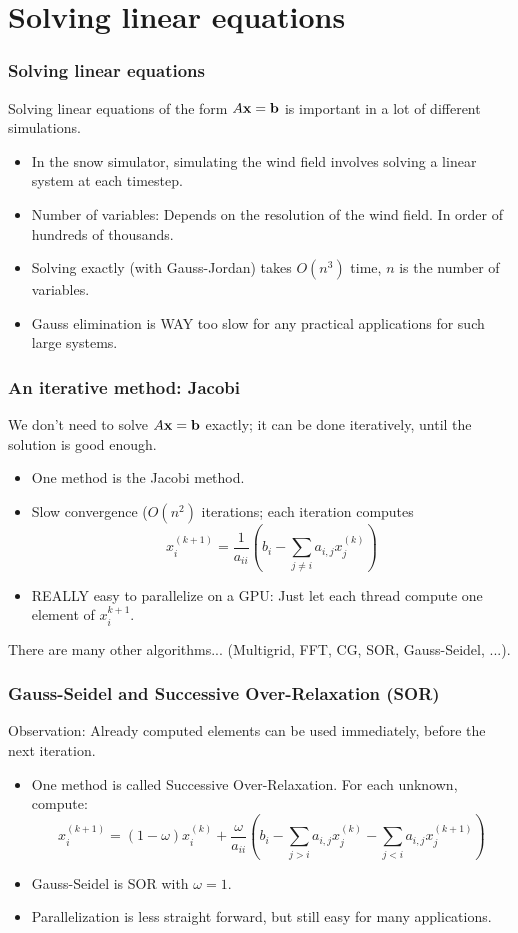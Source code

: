 \section{Solving linear equations}
\begin{frame}
\frametitle{Solving linear equations}
Solving linear equations of the form $A\bf{x} = \bf{b}$ is important in a lot of different simulations.

\begin{itemize}
\item In the snow simulator, simulating the wind field involves solving a linear system at each timestep.
\item Number of variables: Depends on the resolution of the wind field. In order of hundreds of thousands.
\item Solving exactly (with Gauss-Jordan) takes $O(n^3)$ time, $n$ is the number of variables.
\item Gauss elimination is WAY too slow for any practical applications for such large systems.
\end{itemize}

\end{frame}

\begin{frame}
\frametitle{An iterative method: Jacobi}
We don't need to solve $A\bf{x} = \bf{b}$ exactly; it can be done iteratively, until the solution is good enough.
\begin{itemize}
\item One method is the Jacobi method.
\item Slow convergence ($O(n^2)$ iterations; each iteration computes
$$
x_i^{(k+1)} = \frac{1}{a_{ii}}\left(b_i-\sum_{j\neq i} a_{i,j}x_j^{(k)}\right)
$$
\item REALLY easy to parallelize on a GPU: Just let each thread compute one element of $x_i^{k+1}$.
\end{itemize}

There are many other algorithms... (Multigrid, FFT, CG, SOR, Gauss-Seidel, ...).
\end{frame}

\begin{frame}
\frametitle{Gauss-Seidel and Successive Over-Relaxation (SOR)}
Observation: Already computed elements can be used immediately, before the next iteration. 
\begin{itemize}
\item One method is called Successive Over-Relaxation. For each unknown, compute:
$$
x_i^{(k+1)} = (1-\omega)x_i^{(k)} + \frac{\omega}{a_{ii}}\left(b_i-\sum_{j > i} a_{i,j}x_j^{(k)}-\sum_{j < i} a_{i,j}x_j^{(k+1)}\right)
$$
\item Gauss-Seidel is SOR with $\omega = 1$.
\item Parallelization is less straight forward, but still easy for many applications.
\end{itemize}

\end{frame}

